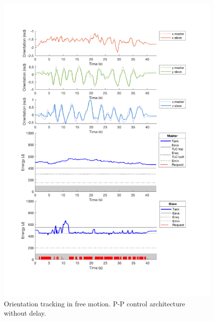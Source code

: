 \begin{center}
		\begin{figure}
		\includegraphics[width=\textwidth, keepaspectratio]{plots/ppFree/Orientation.pdf}
		\caption{Orientation tracking in free motion. P-P control architecture without delay.}
		\label{graph:ppFree/Orientation}
	\end{figure}
\end{center}
